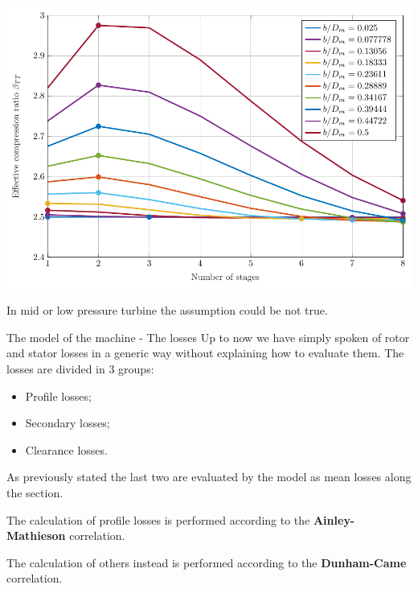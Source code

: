\documentclass{beamer}
\newcommand{\myspaceneg}[0]{\vspace{-0.15cm}}
\newcommand{\highlightgreenC}[1]{\textcolor{chameleongreen3}{#1}}%
\begin{document}
\begin{frame}
\begin{center}
\includegraphics[scale=0.65]{fig/betareal_bsuD_example.pdf} 
\end{center}
\myspaceneg
\myspaceneg
\begin{center}
In mid or low pressure turbine the assumption could be not true.
\end{center}
\end{frame}


\begin{frame}[t]{The model of the machine - The losses}
Up to now we have simply spoken of rotor and stator losses in a generic way without explaining how to evaluate them.
The losses are divided in 3 groups:
\begin{itemize}
	\item Profile losses;
	\item Secondary losses;
	\item Clearance losses.
\end{itemize}
As previously stated the last two are evaluated by the model as mean losses along the section.

\begin{center}
The calculation of profile losses is performed according to the \highlightgreenC{\textbf{Ainley-Mathieson}} correlation. 
\end{center}

\begin{center}
The calculation of others instead is performed according to the \highlightgreenC{\textbf{Dunham-Came}} correlation.
\end{center}
\end{frame}
\end{document}
